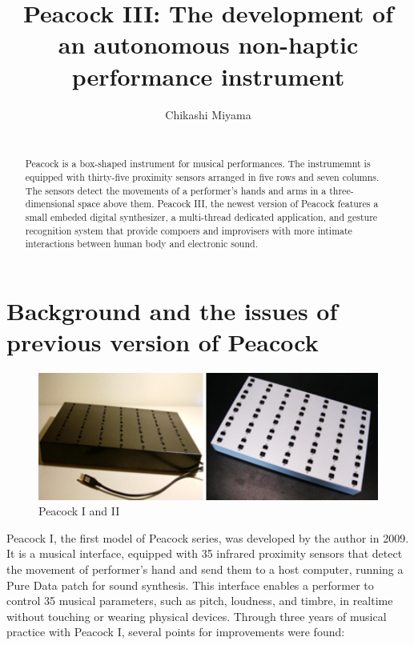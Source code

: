 \documentclass{nime-alternate}
\begin{document}
\title{Peacock III: The development of an autonomous non-haptic performance instrument}
\author{
\alignauthor
Chikashi Miyama\\
       \\
}

\maketitle
\begin{abstract}
Peacock is a box-shaped instrument for musical performances. The instrumemnt is equipped with thirty-five proximity sensors arranged in five rows and seven columns. The sensors detect the movements of a performer's hands and arms in a three-dimensional space above them. Peacock III, the newest version of Peacock features a small embeded digital synthesizer, a multi-thread dedicated application, and gesture recognition system that provide compoers and improvisers with more intimate interactions between human body and electronic sound. 
\end{abstract}

\section{Background and the issues of previous version of Peacock}

\begin{figure}[htbp]
       \begin{center}
              \includegraphics[scale = 0.55]{Peacocks.pdf}
       \end{center}
       \caption{Peacock I and II}
       \label{fig:old_peacock}
\end{figure}

Peacock I, the first model of Peacock series, was developed by the author in 2009\cite{miyama:peacock}. It is a musical interface, equipped with 35 infrared proximity sensors that detect the movement of performer's hand and send them to a host computer, running a Pure Data\cite{Pd} patch for sound synthesis. This interface enables a performer to control 35 musical parameters, such as pitch, loudness, and timbre, in realtime without touching or wearing physical devices. Through three years of musical practice with Peacock I, several points for improvements were found:
\end{document}
